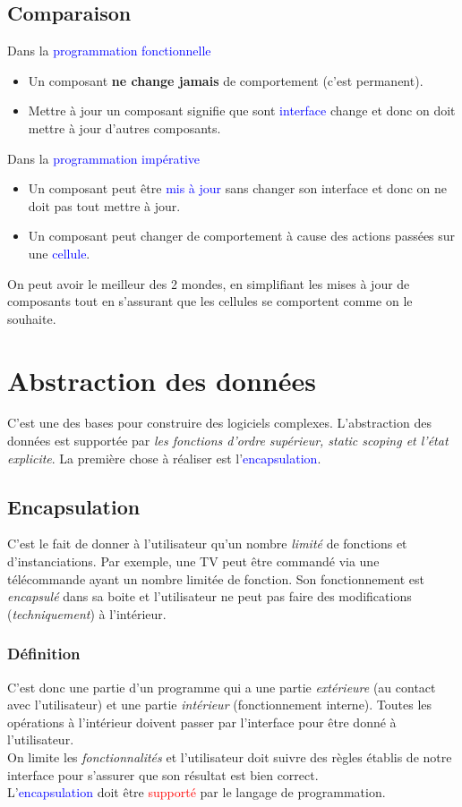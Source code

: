 \documentclass{report}
\begin{document}
\subsection{Comparaison}
Dans la \textcolor{blue}{programmation fonctionnelle}
\begin{itemize}
\item Un composant \textbf{ne change jamais} de comportement (c'est permanent).
\item Mettre à jour un composant signifie que sont \textcolor{blue}{interface} change et donc on doit mettre à jour d'autres composants.
\end{itemize}
Dans la \textcolor{blue}{programmation impérative}
\begin{itemize}
\item Un composant peut être \textcolor{blue}{mis à jour} sans changer son interface et donc on ne doit pas tout mettre à jour.
\item Un composant peut changer de comportement à cause des actions passées sur une \textcolor{blue}{cellule}.
\end{itemize}
On peut avoir le meilleur des 2 mondes, en simplifiant les mises à jour de composants tout en s'assurant que les cellules se comportent comme on le souhaite.

\section{Abstraction des données}
C'est une des bases pour construire des logiciels complexes. L'abstraction des données est supportée par \textit{les fonctions d'ordre supérieur, static scoping et l'état explicite}. La première chose à réaliser est l'\textcolor{blue}{encapsulation}.

\subsection{Encapsulation}
C'est le fait de donner à l'utilisateur qu'un nombre \textit{limité} de fonctions et d'instanciations. Par exemple, une TV peut être commandé via une télécommande ayant un nombre limitée de fonction. Son fonctionnement est \textit{encapsulé} dans sa boite et l'utilisateur ne peut pas faire des modifications (\textit{techniquement}) à l'intérieur.

\subsubsection{Définition}
C'est donc une partie d'un programme qui a une partie \textit{extérieure} (au contact avec l'utilisateur) et une partie \textit{intérieur} (fonctionnement interne). Toutes les opérations à l'intérieur doivent passer par l'interface pour être donné à l'utilisateur.\\
On limite les \textit{fonctionnalités} et l'utilisateur doit suivre des règles établis de notre interface pour s'assurer que son résultat est bien correct.\\
L'\textcolor{blue}{encapsulation} doit être \textcolor{red}{supporté} par le langage de programmation.
\end{document}

